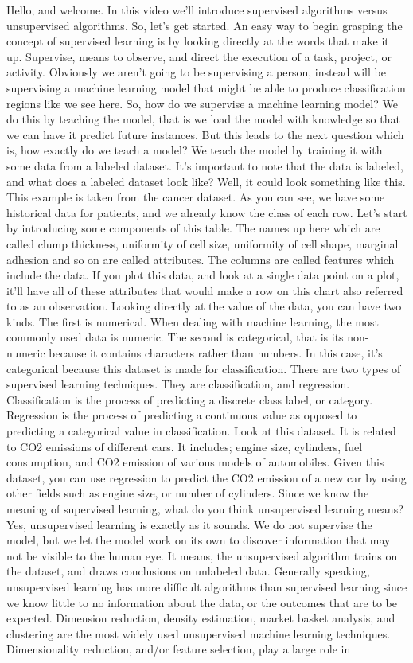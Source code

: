 	Hello, and welcome. In this video we'll introduce supervised algorithms versus unsupervised algorithms. So, let's get started. An easy way to begin grasping the concept of supervised learning is by looking directly at the words that make it up. Supervise, means to observe, and direct the execution of a task, project, or activity. Obviously we aren't going to be supervising a person, instead will be supervising a machine learning model that might be able to produce classification regions like we see here. So, how do we supervise a machine learning model? We do this by teaching the model, that is we load the model with knowledge so that we can have it predict future instances. But this leads to the next question which is, how exactly do we teach a model? We teach the model by training it with some data from a labeled dataset. It's important to note that the data is labeled, and what does a labeled dataset look like? Well, it could look something like this. This example is taken from the cancer dataset. As you can see, we have some historical data for patients, and we already know the class of each row. Let's start by introducing some components of this table. The names up here which are called clump thickness, uniformity of cell size, uniformity of cell shape, marginal adhesion and so on are called attributes. The columns are called features which include the data. If you plot this data, and look at a single data point on a plot, it'll have all of these attributes that would make a row on this chart also referred to as an observation. Looking directly at the value of the data, you can have two kinds. The first is numerical. When dealing with machine learning, the most commonly used data is numeric. The second is categorical, that is its non-numeric because it contains characters rather than numbers. In this case, it's categorical because this dataset is made for classification. There are two types of supervised learning techniques. They are classification, and regression. Classification is the process of predicting a discrete class label, or category. Regression is the process of predicting a continuous value as opposed to predicting a categorical value in classification. Look at this dataset. It is related to CO2 emissions of different cars. It includes; engine size, cylinders, fuel consumption, and CO2 emission of various models of automobiles. Given this dataset, you can use regression to predict the CO2 emission of a new car by using other fields such as engine size, or number of cylinders. Since we know the meaning of supervised learning, what do you think unsupervised learning means? Yes, unsupervised learning is exactly as it sounds. We do not supervise the model, but we let the model work on its own to discover information that may not be visible to the human eye. It means, the unsupervised algorithm trains on the dataset, and draws conclusions on unlabeled data. Generally speaking, unsupervised learning has more difficult algorithms than supervised learning since we know little to no information about the data, or the outcomes that are to be expected. Dimension reduction, density estimation, market basket analysis, and clustering are the most widely used unsupervised machine learning techniques. Dimensionality reduction, and/or feature selection, play a large role in 